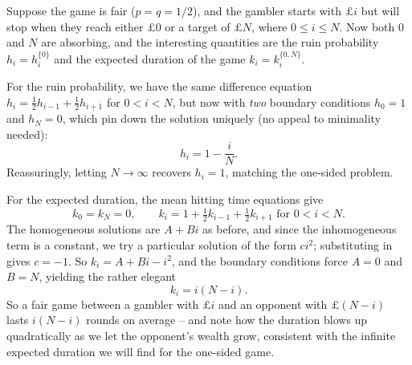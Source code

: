 \documentclass[a4paper]{scrartcl}
\begin{document}
\begin{example}
	Suppose the game is fair ($p = q = 1/2$), and the gambler starts with $\pounds i$ but will stop when they reach either $\pounds 0$ or a target of $\pounds N$, where $0 \leq i \leq N$. Now both 0 and $N$ are absorbing, and the interesting quantities are the ruin probability $h_i = h_i^{\{0\}}$ and the expected duration of the game $k_i = k_i^{\{0, N\}}$.

	\begin{center}
	\end{center}

	For the ruin probability, we have the same difference equation $h_i = \frac{1}{2}h_{i - 1} + \frac{1}{2}h_{i + 1}$ for $0 < i < N$, but now with \emph{two} boundary conditions $h_0 = 1$ and $h_N = 0$, which pin down the solution uniquely (no appeal to minimality needed):
	$$
	h_i = 1 - \frac{i}{N}.
	$$
	Reassuringly, letting $N \to \infty$ recovers $h_i = 1$, matching the one-sided problem.

	For the expected duration, the mean hitting time equations give
	$$
	k_0 = k_N = 0, \qquad k_i = 1 + \tfrac{1}{2}k_{i - 1} + \tfrac{1}{2}k_{i + 1} \text{ for } 0 < i < N.
	$$
	The homogeneous solutions are $A + Bi$ as before, and since the inhomogeneous term is a constant, we try a particular solution of the form $ci^2$; substituting in gives $c = -1$. So $k_i = A + Bi - i^2$, and the boundary conditions force $A = 0$ and $B = N$, yielding the rather elegant
	$$
	k_i = i(N - i).
	$$
	So a fair game between a gambler with $\pounds i$ and an opponent with $\pounds(N - i)$ lasts $i(N - i)$ rounds on average -- and note how the duration blows up quadratically as we let the opponent's wealth grow, consistent with the infinite expected duration we will find for the one-sided game.
\end{example}
\end{document}
